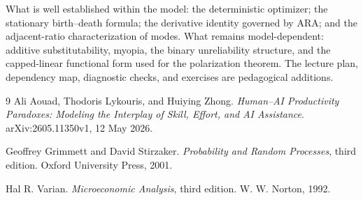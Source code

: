 \documentclass[11pt]{article}
\theoremstyle{tutorial}
\theoremstyle{remark}
\newcommand{\1}{\mathbb{I}}
\begin{document}
What is well established within the model: the deterministic optimizer; the stationary birth--death formula;
the derivative identity governed by ARA; and the adjacent-ratio characterization of modes.  What remains
model-dependent: additive substitutability, myopia, the binary unreliability structure, and the capped-linear
functional form used for the polarization theorem.  The lecture plan, dependency map, diagnostic checks,
and exercises are pedagogical additions.

\begin{thebibliography}{9}
Ali Aouad, Thodoris Lykouris, and Huiying Zhong.
\newblock \emph{Human--AI Productivity Paradoxes: Modeling the Interplay of Skill, Effort, and AI Assistance}.
\newblock arXiv:2605.11350v1, 12 May 2026.

Geoffrey Grimmett and David Stirzaker.
\newblock \emph{Probability and Random Processes}, third edition.
\newblock Oxford University Press, 2001.

Hal R. Varian.
\newblock \emph{Microeconomic Analysis}, third edition.
\newblock W. W. Norton, 1992.
\end{thebibliography}
\end{document}
